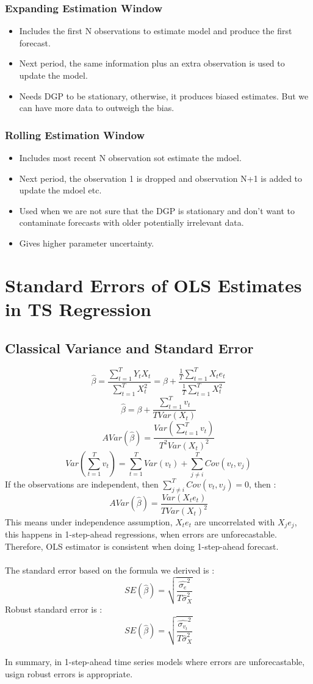 \documentclass{article}
\begin{document}
\subsubsection{Expanding Estimation Window}
\begin{itemize}
    \item Includes the first N observations to estimate model and produce the first forecast.
    \item Next period, the same information plus an extra observation is used to update the model.
    \item Needs DGP to be stationary, otherwise, it produces biased estimates. But we can have more data to outweigh the bias.
\end{itemize}

\subsubsection{Rolling Estimation Window}
\begin{itemize}
    \item Includes most recent N observation sot estimate the mdoel.
    \item Next period, the observation 1 is dropped and observation N+1 is added to update the mdoel etc.
    \item Used when we are not sure that the DGP is stationary and don't want to contaminate forecasts with older potentially irrelevant data.
    \item Gives higher parameter uncertainty.
\end{itemize}


\section{Standard Errors of OLS Estimates in TS Regression}
\subsection{Classical Variance and Standard Error}
$$\hat{\beta} = \frac{\sum_{t=1}^T Y_t X_t}{\sum_{t=1}^T X_t^2} = \beta + \frac{\frac{1}{T}\sum_{t=1}^T X_t e_t}{\frac{1}{T}\sum_{t=1}^T X_t^2}$$
$$\hat{\beta} = \beta + \frac{\sum_{t=1}^T v_t}{TVar(X_t)}$$
$$AVar(\hat{\beta}) = \frac{Var(\sum_{t=1}^T v_t)}{T^2 Var(X_t)^2}$$
$$Var(\sum_{t=1}^T v_t) = \sum_{t=1}^T Var(v_t) + \sum_{j\neq i}^T Cov(v_t, v_j)$$
If the observations are independent, then $\sum_{j\neq i}^T Cov(v_t, v_j) = 0$, then :
$$AVar(\hat{\beta}) = \frac{Var(X_t e_t)}{TVar(X_t)^2}$$
This means under independence assumption, $X_t e_t$ are uncorrelated with $X_j e_j$, this happens in 1-step-ahead regressions, when errors are unforecastable. Therefore, OLS estimator is consistent when doing 1-step-ahead forecast.\\
\\
The standard error based on the formula we derived is :
$$SE(\hat{\beta}) = \sqrt{\frac{\hat{\sigma_e}^2}{T\hat{\sigma}_X^2}}$$
Robust standard error is :
$$SE(\hat{\beta}) = \sqrt{\frac{\hat{\sigma_{v_t}}^2}{T\hat{\sigma}_X^2}}$$
\\
In summary, in 1-step-ahead time series models where errors are unforecastable, usign robust errors is appropriate.
\end{document}
